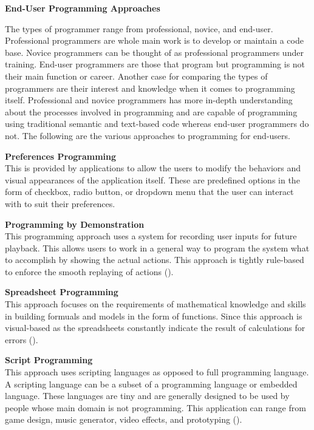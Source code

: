 \flushleft
\textbf{End-User Programming Approaches}\\
\justifying

\parx
The types of programmer range from professional, novice, and end-user. Professional
programmers are whole main work is to develop or maintain a code base. Novice
programmers can be thought of as professional programmers under training. End-user
programmers are those that program but programming is not their main function or
career. Another case for comparing the types of programmers are their interest and
knowledge when it comes to programming itself. Professional and novice programmers has
more in-depth understanding about the processes involved in programming and are capable
of programming using traditional semantic and text-based code whereas end-user
programmers do not. The following are the various approaches to programming for
end-users.

\flushleft
\textbf{Preferences Programming}\\
\justifying
\parx
This is provided by applications to allow the users to modify the behaviors and visual
appearances of the application itself. These are predefined options in the form of
checkbox, radio button, or dropdown menu that the user can interact with to suit
their preferences.

\flushleft
\textbf{Programming by Demonstration}\\
\justifying
\parx
This programming approach uses a system for recording user inputs for future playback.
This allows users to work in a general way to program the system what to accomplish
by showing the actual actions. This approach is tightly rule-based to enforce the
smooth replaying of actions (\cite{harrison_2004}).

\flushleft
\textbf{Spreadsheet Programming}\\
\justifying
\parx
This approach focuses on the requirements of mathematical knowledge and skills in
building formuals and models in the form of functions. Since this approach is
visual-based as the spreadsheets constantly indicate the result of calculations for
errors (\cite{abraham_burnett_erwig_2009}).

\flushleft
\textbf{Script Programming}\\
\justifying
\parx
This approach uses scripting languages as opposed to full programming language. A
scripting language can be a subset of a programming language or embedded language. These
languages are tiny and are generally designed to be used by people whose main domain
is not programming. This application can range from game design, music generator,
video effects, and prototyping (\cite{ousterhout_1998}).
